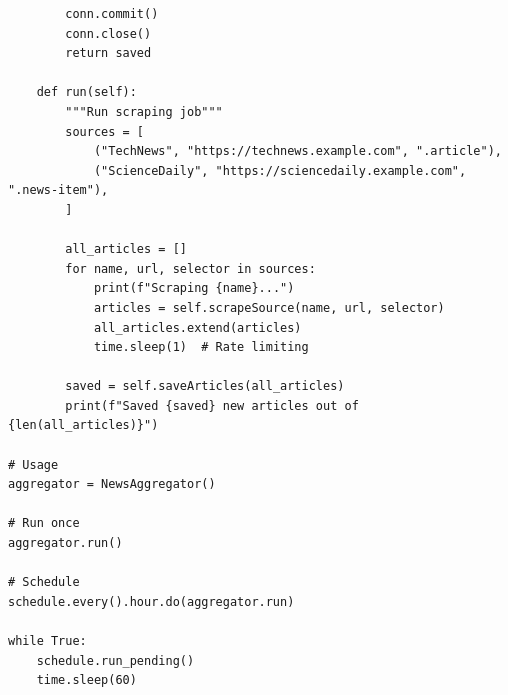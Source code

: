 \begin{lstlisting}
        conn.commit()
        conn.close()
        return saved

    def run(self):
        """Run scraping job"""
        sources = [
            ("TechNews", "https://technews.example.com", ".article"),
            ("ScienceDaily", "https://sciencedaily.example.com", ".news-item"),
        ]

        all_articles = []
        for name, url, selector in sources:
            print(f"Scraping {name}...")
            articles = self.scrapeSource(name, url, selector)
            all_articles.extend(articles)
            time.sleep(1)  # Rate limiting

        saved = self.saveArticles(all_articles)
        print(f"Saved {saved} new articles out of {len(all_articles)}")

# Usage
aggregator = NewsAggregator()

# Run once
aggregator.run()

# Schedule
schedule.every().hour.do(aggregator.run)

while True:
    schedule.run_pending()
    time.sleep(60)
\end{lstlisting}

